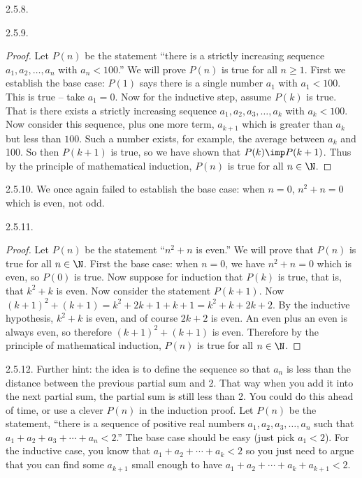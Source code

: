 \begin {itemize}
\begin{ans}{2.5.8.}
\end{ans}
\begin{ans}{2.5.9.}
		\begin{proof}
		 Let $P(n)$ be the statement ``there is a strictly increasing sequence $a_1, a_2, \ldots, a_n$ with $a_n < 100$.''  We will prove $P(n)$ is true for all $n \ge 1$. First we establish the base case: $P(1)$ says there is a single number $a_1$ with $a_1 < 100$.  This is true -- take $a_1 = 0$.  Now for the inductive step, assume $P(k)$ is true.  That is there exists a strictly increasing sequence $a_1, a_2, a_3, \ldots, a_k$ with $a_k < 100$.  Now consider this sequence, plus one more term, $a_{k+1}$ which is greater than $a_k$ but less than $100$.  Such a number exists, for example, the average between $a_k$ and 100.  So then $P(k+1)$ is true, so we have shown that $P(k) \imp P(k+1)$.  Thus by the principle of mathematical induction, $P(n)$ is true for all $n \in \N$.
		\end{proof}

	
\end{ans}
\begin{ans}{2.5.10.}
  		We once again failed to establish the base case: when $n = 0$, $n^2 + n = 0$ which is even, not odd.
  	
\end{ans}
\begin{ans}{2.5.11.}
		  \begin{proof}
		    Let $P(n)$ be the statement ``$n^2 + n$ is even.''  We will prove that $P(n)$ is true for all $n \in \N$.  First the base case: when $n = 0$, we have $n^2 + n = 0$ which is even, so $P(0)$ is true.  Now suppose for induction that $P(k)$ is true, that is, that $k^2 + k$ is even.  Now consider the statement $P(k+1)$.  Now $(k+1)^2 + (k+1) = k^2 + 2k + 1 + k + 1 = k^2 + k + 2k + 2$.  By the inductive hypothesis, $k^2 + k$ is even, and of course $2k + 2$ is even.  An even plus an even is always even, so therefore $(k+1)^2 + (k+1)$ is even.  Therefore by the principle of mathematical induction, $P(n)$ is true for all $n \in \N$.
		  \end{proof}
	
\end{ans}
\begin{ans}{2.5.12.}
		 Further hint: the idea is to define the sequence so that $a_n$ is less than the distance between the previous partial sum and 2.  That way when you add it into the next partial sum, the partial sum is still less than 2.  You could do this ahead of time, or use a clever $P(n)$ in the induction proof.  Let $P(n)$ be the statement, ``there is a sequence of positive real numbers $a_1, a_2, a_3, \ldots, a_n$ such that $a_1 + a_2 + a_3 + \cdots + a_n < 2$.''  The base case should be easy (just pick $a_1 < 2$).  For the inductive case, you know that $a_1 + a_2 + \cdots + a_k < 2$ so you just need to argue that you can find some $a_{k+1}$ small enough to have $a_1 + a_2 + \cdots +a_k + a_{k+1} < 2$.
	

\end{ans}
\end{itemize}
